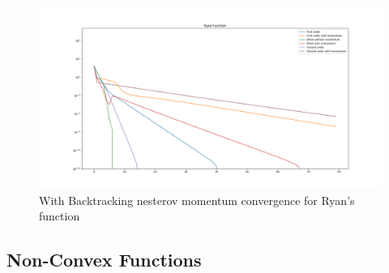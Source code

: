 \documentclass{article}
\begin{document}
\begin{center}
\begin{figure}[H]
	\includegraphics[width=\linewidth]{../Images/ryanbacktrack1.png}
	\caption{With Backtracking nesterov momentum convergence for Ryan's function}
	\label{fig:With Backtracking nesterov momentum convergence for Ryan's function}
\end{figure}
\end{center}
\subsection{Non-Convex Functions}
\end{document}
